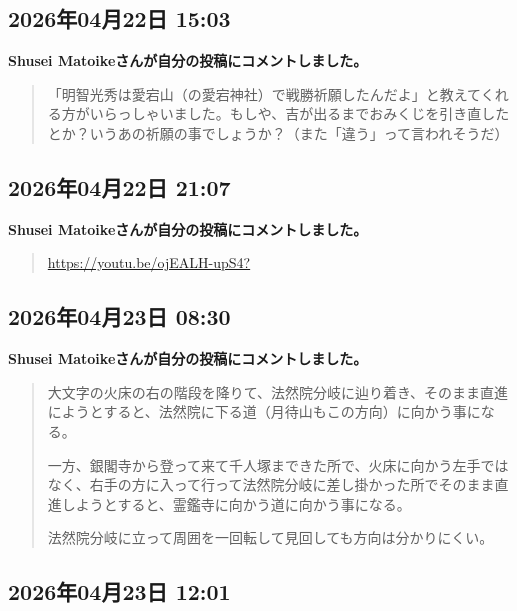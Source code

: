 \subsection*{2026年04月22日 15:03}

\textbf{Shusei Matoikeさんが自分の投稿にコメントしました。}

\begin{quote}
「明智光秀は愛宕山（の愛宕神社）で戦勝祈願したんだよ」と教えてくれる方がいらっしゃいました。もしや、吉が出るまでおみくじを引き直したとか？いうあの祈願の事でしょうか？（また「違う」って言われそうだ）
\end{quote}

\subsection*{2026年04月22日 21:07}

\textbf{Shusei Matoikeさんが自分の投稿にコメントしました。}

\begin{quote}
\url{https://youtu.be/ojEALH-upS4?}
\end{quote}

\subsection*{2026年04月23日 08:30}

\textbf{Shusei Matoikeさんが自分の投稿にコメントしました。}

\begin{quote}
大文字の火床の右の階段を降りて、法然院分岐に辿り着き、そのまま直進にようとすると、法然院に下る道（月待山もこの方向）に向かう事になる。

一方、銀閣寺から登って来て千人塚まできた所で、火床に向かう左手ではなく、右手の方に入って行って法然院分岐に差し掛かった所でそのまま直進しようとすると、霊鑑寺に向かう道に向かう事になる。

法然院分岐に立って周囲を一回転して見回しても方向は分かりにくい。
\end{quote}

\subsection*{2026年04月23日 12:01}


